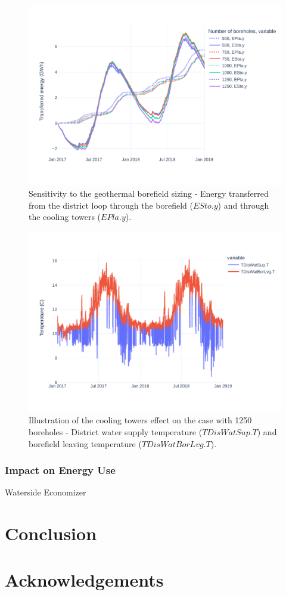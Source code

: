 \begin{figure}[h!]
\centering
\includegraphics[width=\linewidth]{figures/GeoSizingE.pdf}
\caption{Sensitivity to the geothermal borefield sizing - Energy transferred from the district loop through the borefield ($ESto.y$) and through the cooling towers ($EPla.y$).}
\label{fig:fan}
\end{figure}


\begin{figure}[h!]
\centering
\includegraphics[width=\linewidth]{figures/GeoBestCaseT.pdf}
\caption{Illustration of the cooling towers effect on the case with 1250 boreholes - District water supply temperature ($TDisWatSup.T$) and borefield leaving temperature ($TDisWatBorLvg.T$).}
\label{fig:fan}
\end{figure}


\subsubsection{Impact on Energy Use} \label{sec:energy}

Waterside Economizer




\section{Conclusion} \label{sec:concl}



\section{Acknowledgements} \label{sec:acknowledge}
